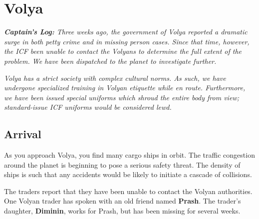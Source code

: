 \documentclass[11pt, a5paper, parskip=half-, DIV=12]{scrartcl}
\begin{document}
\section*{Volya}
\textit{\textbf{Captain's Log:} Three weeks ago, the government of Volya reported a dramatic surge in both petty crime and in missing person cases. Since that time, however, the ICF been unable to contact the Volyans to determine the full extent of the problem. We have been dispatched to the planet to investigate further.}


\textit{Volya has a strict society with complex cultural norms. As such, we have undergone specialized training in Volyan etiquette while en route. Furthermore, we have been issued special uniforms which shroud the entire body from view; standard-issue ICF uniforms would be considered lewd.}


\subsection*{Arrival}
As you approach Volya, you find many cargo ships in orbit.
The traffic congestion around the planet is beginning to pose a serious safety threat. The density of ships is such that any accidents would be likely to initiate a cascade of collisions.

The traders report that they have been unable to contact the Volyan authorities. 
One Volyan trader has spoken with an old friend named \textbf{Prash}. The trader's daughter, \textbf{Diminin}, works for Prash, but has been missing for several weeks.
\end{document}
